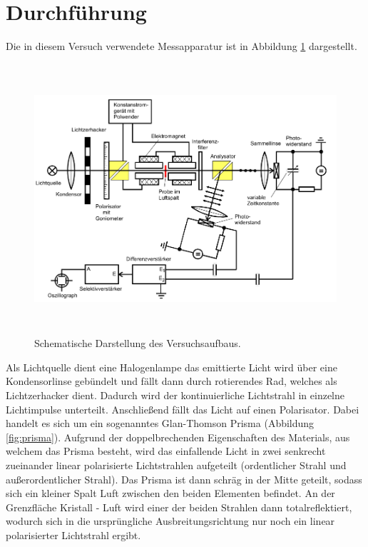 \section{Durchführung}
\label{sec:Durchführung}

Die in diesem Versuch verwendete Messapparatur ist in Abbildung \ref{fig:aufbau}
dargestellt.

\begin{figure}[H]
  \centering
  \includegraphics[height=10cm]{Aufbau.PNG}
  \caption{Schematische Darstellung des Versuchsaufbaus. \cite{sample}}
  \label{fig:aufbau}
\end{figure}

Als Lichtquelle dient eine Halogenlampe das emittierte Licht wird über eine
Kondensorlinse gebündelt und fällt dann durch rotierendes Rad, welches als Lichtzerhacker
dient. Dadurch wird der kontinuierliche Lichtstrahl in einzelne Lichtimpulse unterteilt.
Anschließend fällt das Licht auf einen Polarisator. Dabei handelt es sich um
ein sogenanntes Glan-Thomson Prisma (Abbildung \ref{fig:prisma}). Aufgrund der doppelbrechenden Eigenschaften
des Materials, aus welchem das Prisma besteht, wird das einfallende Licht in
zwei senkrecht zueinander linear polarisierte Lichtstrahlen aufgeteilt (ordentlicher Strahl
und außerordentlicher Strahl). Das Prisma ist dann schräg in der Mitte geteilt,
sodass sich ein kleiner Spalt Luft zwischen den beiden Elementen befindet.
An der Grenzfläche Kristall - Luft wird einer der beiden Strahlen dann totalreflektiert,
wodurch sich in die ursprüngliche Ausbreitungsrichtung nur noch ein linear polarisierter
Lichtstrahl ergibt.

